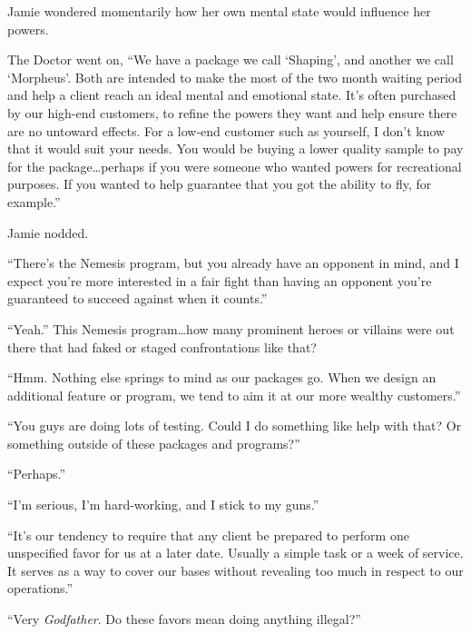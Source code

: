 Jamie wondered momentarily how her own mental state would influence her powers.



The Doctor went on, ``We have a package we call `Shaping', and another we call `Morpheus'.  Both are intended to make the most of the two month waiting period and help a client reach an ideal mental and emotional state.  It's often purchased by our high-end customers, to refine the powers they want and help ensure there are no untoward effects. For a low-end customer such as yourself, I don't know that it would suit your needs.  You would be buying a lower quality sample to pay for the package\ldots perhaps if you were someone who wanted powers for recreational purposes.  If you wanted to help guarantee that you got the ability to fly, for example.''



Jamie nodded.



``There's the Nemesis program, but you already have an opponent in mind, and I expect you're more interested in a fair fight than having an opponent you're guaranteed to succeed against when it counts.''



``Yeah.''  This Nemesis program\ldots how many prominent heroes or villains were out there that had faked or staged confrontations like that?



``Hmm.  Nothing else springs to mind as our packages go.  When we design an additional feature or program, we tend to aim it at our more wealthy customers.''



``You guys are doing lots of testing.  Could I do something like help with that?  Or something outside of these packages and programs?''



``Perhaps.''



``I'm serious, I'm hard-working, and I stick to my guns.''



``It's our tendency to require that any client be prepared to perform one unspecified favor for us at a later date.  Usually a simple task or a week of service.  It serves as a way to cover our bases without revealing too much in respect to our operations.''



``Very \emph{Godfather}.  Do these favors mean doing anything illegal?''



